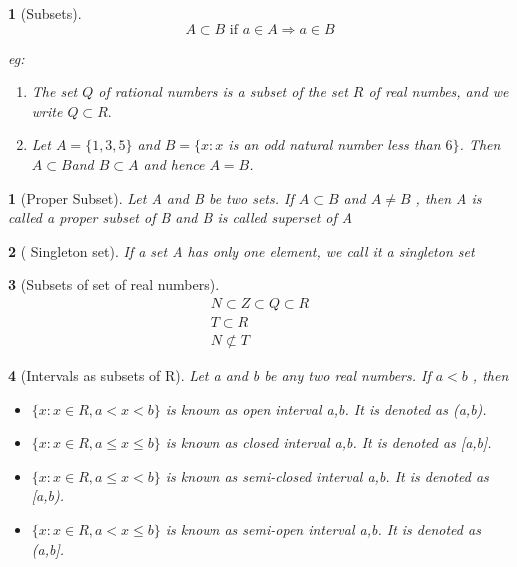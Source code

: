 \documentclass[12pt]{article}
\theoremstyle{colored}
\newtheorem*{defn}{}
\theoremstyle{subcolored}
\newtheorem*{subdefn}{}
\begin{document}
\begin{multicols}{2}
\begin{defn}[\large Subsets]
$$A \subset B \text{ if } a \in A \Rightarrow a \in B$$

eg: \begin{enumerate}
    \item[a)] The set $Q$ of rational numbers is a subset of the set $R$ of real numbes, and
    we write $Q \subset R.$
    \item[b)]  Let $A = \{1, 3, 5\}$ and $B = \{x : x$ is an odd natural number less than $6\}$. Then
   $ A \subset B $and $B \subset A$ and hence $A = B$.
\end{enumerate}
\end{defn}

\begin{subdefn}[Proper Subset]
    Let A and B be two sets. If $A \subset B$ and $A \neq B$ , then A is called a proper subset
of B and B is called superset of A
    
\end{subdefn}
\begin{subdefn}[ Singleton set]
    If a set A has only one element, we call it a singleton set
   
\end{subdefn}
\begin{subdefn}[Subsets of set of real numbers]
    \begin{align*}
        N \subset Z \subset Q \subset R\\
        T \subset R \\
         N \not \subset T 
    \end{align*}

    
\end{subdefn}

\begin{subdefn}[Intervals as subsets of R]
    \hfill \break
    Let a and b be any two real numbers. If $a 
    < b$ , then\\
\begin{itemize}
    \item  $\{x : x \in R, a < x < b \}$ is known as open interval a,b. It is denoted as (a,b).
   \item  $\{x : x \in R, a \leq x \leq b \}$ is known as closed interval a,b. It is denoted as [a,b].
   \item  $\{x : x \in R, a \leq x < b \}$ is known as semi-closed interval a,b. It is denoted as [a,b).
   \item $\{x : x \in R, a < x \leq b \}$ is known as semi-open interval a,b. It is denoted as (a,b].
\end{itemize}


\end{subdefn}
\end{multicols}
\end{document}
